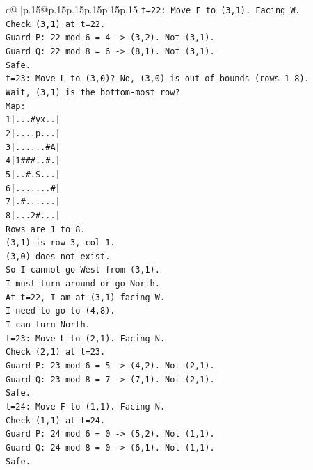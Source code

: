 \documentclass{article}
\begin{document}
{\begin{supertabular}{c@{$\;$}|p{.15\linewidth}@{}p{.15\linewidth}p{.15\linewidth}p{.15\linewidth}p{.15\linewidth}p{.15\linewidth}}
{{{\texttt{t=22: Move F to (3,1). Facing W.} \\
\texttt{Check (3,1) at t=22.} \\
\texttt{Guard P: 22 mod 6 = 4 {-}> (3,2). Not (3,1).} \\
\texttt{Guard Q: 22 mod 8 = 6 {-}> (8,1). Not (3,1).} \\
\texttt{Safe.} \\
\texttt{t=23: Move L to (3,0)? No, (3,0) is out of bounds (rows 1{-}8).} \\
\texttt{Wait, (3,1) is the bottom{-}most row?} \\
\texttt{Map:} \\
\texttt{1|...\#yx..|} \\
\texttt{2|....p...|} \\
\texttt{3|......\#A|} \\
\texttt{4|1\#\#\#..\#.|} \\
\texttt{5|..\#.S...|} \\
\texttt{6|.......\#|} \\
\texttt{7|.\#......|} \\
\texttt{8|...2\#...|} \\
\texttt{Rows are 1 to 8.} \\
\texttt{(3,1) is row 3, col 1.} \\
\texttt{(3,0) does not exist.} \\
\texttt{So I cannot go West from (3,1).} \\
\texttt{I must turn around or go North.} \\
\texttt{At t=22, I am at (3,1) facing W.} \\
\texttt{I need to go to (4,8).} \\
\texttt{I can turn North.} \\
\texttt{t=23: Move L to (2,1). Facing N.} \\
\texttt{Check (2,1) at t=23.} \\
\texttt{Guard P: 23 mod 6 = 5 {-}> (4,2). Not (2,1).} \\
\texttt{Guard Q: 23 mod 8 = 7 {-}> (7,1). Not (2,1).} \\
\texttt{Safe.} \\
\texttt{t=24: Move F to (1,1). Facing N.} \\
\texttt{Check (1,1) at t=24.} \\
\texttt{Guard P: 24 mod 6 = 0 {-}> (5,2). Not (1,1).} \\
\texttt{Guard Q: 24 mod 8 = 0 {-}> (6,1). Not (1,1).} \\
\texttt{Safe.} \\
}}}
\end{supertabular}}
\end{document}
